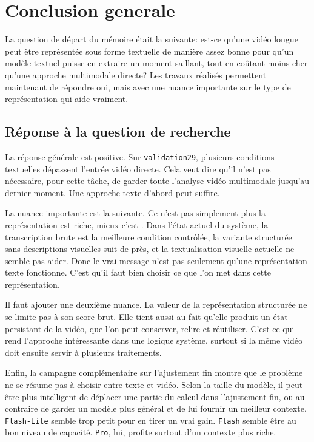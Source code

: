 \chapter{Conclusion generale}

La question de d\'epart du m\'emoire \'etait la suivante: est-ce qu'une vid\'eo longue peut \^etre repr\'esent\'ee sous forme textuelle de mani\`ere assez bonne pour qu'un mod\`ele textuel puisse en extraire un moment saillant, tout en co\^utant moins cher qu'une approche multimodale directe? Les travaux r\'ealis\'es permettent maintenant de r\'epondre oui, mais avec une nuance importante sur le type de repr\'esentation qui aide vraiment.

\section{R\'eponse \`a la question de recherche}

La r\'eponse g\'en\'erale est positive. Sur \texttt{validation29}, plusieurs conditions textuelles d\'epassent l'entr\'ee vid\'eo directe. Cela veut dire qu'il n'est pas n\'ecessaire, pour cette t\^ache, de garder toute l'analyse vid\'eo multimodale jusqu'au dernier moment. Une approche texte d'abord peut suffire.

La nuance importante est la suivante. Ce n'est pas simplement \og plus la repr\'esentation est riche, mieux c'est \fg{}. Dans l'\'etat actuel du syst\`eme, la transcription brute est la meilleure condition contr\^ol\'ee, la variante structur\'ee sans descriptions visuelles suit de pr\`es, et la textualisation visuelle actuelle ne semble pas aider. Donc le vrai message n'est pas seulement qu'une repr\'esentation texte fonctionne. C'est qu'il faut bien choisir ce que l'on met dans cette repr\'esentation.

Il faut ajouter une deuxi\`eme nuance. La valeur de la repr\'esentation structur\'ee ne se limite pas \`a son score brut. Elle tient aussi au fait qu'elle produit un \'etat persistant de la vid\'eo, que l'on peut conserver, relire et r\'eutiliser. C'est ce qui rend l'approche int\'eressante dans une logique syst\`eme, surtout si la m\^eme vid\'eo doit ensuite servir \`a plusieurs traitements.

Enfin, la campagne compl\'ementaire sur l'ajustement fin montre que le probl\`eme ne se r\'esume pas \`a choisir entre texte et vid\'eo. Selon la taille du mod\`ele, il peut \^etre plus intelligent de d\'eplacer une partie du calcul dans l'ajustement fin, ou au contraire de garder un mod\`ele plus g\'en\'eral et de lui fournir un meilleur contexte. \texttt{Flash-Lite} semble trop petit pour en tirer un vrai gain. \texttt{Flash} semble \^etre au bon niveau de capacit\'e. \texttt{Pro}, lui, profite surtout d'un contexte plus riche.

